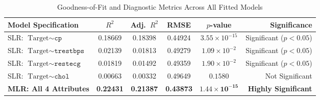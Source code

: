 \documentclass[12pt,a4paper]{article}
\begin{document}
\begin{table}[H]
    \centering
    \caption{Goodness-of-Fit and Diagnostic Metrics Across All Fitted Models}
    \label{tab:goodness_of_fit}
    \small
    \begin{tabularx}{\textwidth}{@{}l C C C C R@{}}
        \toprule
        \textbf{Model Specification} & \textbf{$R^2$} & \textbf{Adj.\ $R^2$} & \textbf{RMSE} & \textbf{$p$-value} & \textbf{Significance} \\
        \midrule
        SLR: $\text{Target} \sim \texttt{cp}$       & 0.18669 & 0.18398 & 0.44924 & $3.55 \times 10^{-15}$ & Significant ($p < 0.05$) \\
        SLR: $\text{Target} \sim \texttt{trestbps}$ & 0.02139 & 0.01813 & 0.49279 & $1.09 \times 10^{-2}$  & Significant ($p < 0.05$) \\
        SLR: $\text{Target} \sim \texttt{restecg}$  & 0.01819 & 0.01492 & 0.49359 & $1.90 \times 10^{-2}$  & Significant ($p < 0.05$) \\
        SLR: $\text{Target} \sim \texttt{chol}$     & 0.00663 & 0.00332 & 0.49649 & $0.1580$               & Not Significant \\
        \midrule
        \textbf{MLR: All 4 Attributes}              & \textbf{0.22431} & \textbf{0.21387} & \textbf{0.43873} & $\mathbf{1.44 \times 10^{-15}}$ & \textbf{Highly Significant} \\
        \bottomrule
    \end{tabularx}
\end{table}
\end{document}
